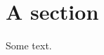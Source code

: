 \documentclass{article}
\begin{document}
\tableofcontents
\section{A section}
Some text.
\end{document}
